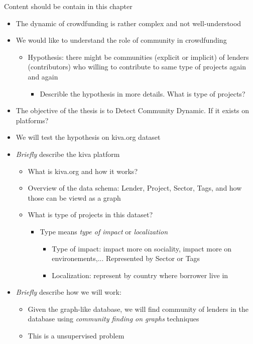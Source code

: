 Content should be contain in this chapter

\begin{itemize}
	\item The dynamic of crowdfunding is rather complex and not well-understood
	\item We would like to understand the role of community in crowdfunding
	      \begin{itemize}
		      \item Hypothesis: there might be communities (explicit or implicit) of lenders (contributors) who willing to contribute to same type of projects again and again
		            \begin{itemize}
			            \item Describle the hypothesis in more details. What is type of projects?
		            \end{itemize}
	      \end{itemize}
	\item The objective of the thesis is to Detect Community Dynamic. If it exists on platforms?
	\item We will test the hypothesis on kiva.org dataset
	\item \textit{Briefly} describe the kiva platform
	      \begin{itemize}
		      \item What is kiva.org and how it works?
		      \item Overview of the data schema: Lender, Project, Sector, Tags, and how those can be viewd as a graph
		      \item What is type of projects in this dataset?
		            \begin{itemize}
			            \item Type means \textit{type of impact} or \textit{localization}
			                  \begin{itemize}
				                  \item Type of impact: impact more on sociality, impact more on environements,... Represented by Sector or Tags
				                  \item Localization: represent by country where borrower live in
			                  \end{itemize}
		            \end{itemize}
	      \end{itemize}
	\item \textit{Briefly} describe how we will work:
	      \begin{itemize}
		      \item Given the graph-like database, we will find community of lenders in the database using \textit{community finding on graphs} techniques
		      \item This is a unsupervised problem
	      \end{itemize}
\end{itemize}


